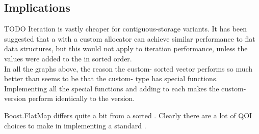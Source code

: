 \subsection{Implications}

TODO Iteration is vastly cheaper for contiguous-storage variants.  It has been
suggested that a  with a custom allocator can achieve similar
performance to flat data structures, but this would not apply to iteration
performance, unless the values were added to the  in sorted order.\\

In all the graphs above, the reason the custom- sorted vector
performs so much better than  seems to be that
the custom- type has  special functions.
Implementing all the special functions and adding  to
each makes the custom- version perform identically to the
 version.

Boost.FlatMap differs quite a bit from a sorted .  Clearly there
are a lot of QOI choices to make in implementing a standard .
